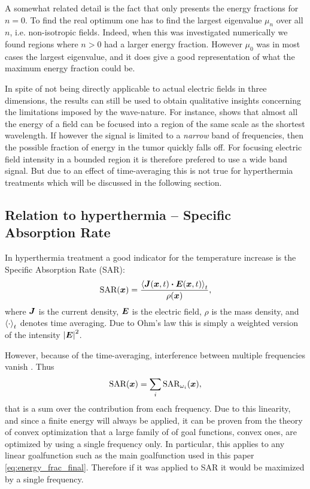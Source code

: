 \documentclass[11pt,a4paper, 
swedish,english %
]{article}
\begin{document}
A somewhat related detail is the fact that  only
presents the energy fractions for $n=0$. To find the
real optimum one has to find the largest eigenvalue $\mu_n$ over all
$n$, i.e. non-isotropic fields. Indeed, when this was investigated
numerically we found regions where $n>0$ had a larger energy
fraction. However $\mu_0$ was in most cases the largest eigenvalue,
and it does give a good representation of what the maximum 
energy fraction could be. 


In spite of not being directly applicable to actual electric fields in
three dimensions,
the results can still be used to obtain 
qualitative insights concerning the limitations imposed by the
wave-nature. For instance,  shows that almost all the
energy of a field can be focused into a region of the same scale as
the shortest wavelength. If however the signal is limited to a
\emph{narrow} band of frequencies, then the possible fraction of
energy in the tumor quickly falls off. 
For focusing electric field intensity in
a bounded region it is therefore prefered to use a wide band
signal. But due to an effect of time-averaging this is not true for
hyperthermia treatments which will be discussed in the following
section. 

\subsection{Relation to hyperthermia -- Specific Absorption Rate}
\label{sec:SAR}
In hyperthermia treatment a good indicator for the temperature
increase is the Specific Absorption Rate (SAR): 
\begin{equation}
\text{SAR}(\vb*x)=
\frac{\ev{\vb*J(\vb*x,t)\vdot \vb*E(\vb*x,t)}_t}{\rho(\vb*x)},
\end{equation}
where $\vb*J$ is the current density, $\vb*E$ is the
electric field, $\rho$ is the mass density, and $\ev{\cdot}_t$ denotes
time averaging. 
Due to Ohm's law this is simply a weighted version of the intensity
$\abs{\vb*E}^2$.

However, because of the time-averaging, interference between multiple
frequencies vanish \cite{Martinsson}. Thus
\begin{equation}
\text{SAR}(\vb*x)=\sum_i\text{SAR}_{\omega_i}(\vb*x),
\end{equation}
that is a sum over the contribution from each frequency.
Due to this linearity, and since a finite energy will always be
applied, it can be proven from the theory of convex optimization
that a large family of of goal functions, convex ones, are optimized
by using a single frequency only. In particular, this applies to any
linear goalfunction such as the main goalfunction used in this paper 
\eqref{eq:energy_frac_final}. Therefore if it was applied to SAR it
would be maximized by a single frequency.   
\end{document}
